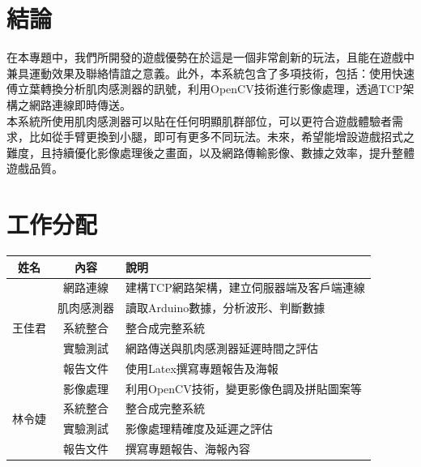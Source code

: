 \documentclass[12pt]{article}  %
\theoremstyle{plain}
\begin{document}
\section{結論}
在本專題中，我們所開發的遊戲優勢在於這是一個非常創新的玩法，且能在遊戲中兼具運動效果及聯絡情誼之意義。此外，本系統包含了多項技術，包括：使用快速傅立葉轉換分析肌肉感測器的訊號，利用OpenCV技術進行影像處理，透過TCP架構之網路連線即時傳送。\\
\indent 本系統所使用肌肉感測器可以貼在任何明顯肌群部位，可以更符合遊戲體驗者需求，比如從手臂更換到小腿，即可有更多不同玩法。未來，希望能增設遊戲招式之難度，且持續優化影像處理後之畫面，以及網路傳輸影像、數據之效率，提升整體遊戲品質。\\
\newpage

\section{工作分配}
\begin{tabular}{|c|c|p{9.5cm}|}
\hline
\cellcolor[HTML]{B2BEB5}姓名 & \cellcolor[HTML]{B2BEB5}內容 & \cellcolor[HTML]{B2BEB5}說明\\
\hline\hline
\multirow{5}{*}{王佳君} & 網路連線 & 建構TCP網路架構，建立伺服器端及客戶端連線 \\
\cline{2-3}
\multirow{5}{*}{} & 肌肉感測器 & 讀取Arduino數據，分析波形、判斷數據 \\
\cline{2-3}
\multirow{5}{*}{} & 系統整合 & 整合成完整系統 \\
\cline{2-3}
\multirow{5}{*}{} & 實驗測試 & 網路傳送與肌肉感測器延遲時間之評估\\
\cline{2-3}
\multirow{5}{*}{} & 報告文件 & 使用Latex撰寫專題報告及海報 \\
\hline
\multirow{4}{*}{林令婕} & 影像處理 & 利用OpenCV技術，變更影像色調及拼貼圖案等 \\
\cline{2-3}
\multirow{4}{*}{} & 系統整合 & 整合成完整系統 \\
\cline{2-3}
\multirow{4}{*}{} & 實驗測試 & 影像處理精確度及延遲之評估 \\
\cline{2-3}
\multirow{4}{*}{} & 報告文件 & 撰寫專題報告、海報內容 \\
\hline
\end{tabular}
\newpage


\end{document}
